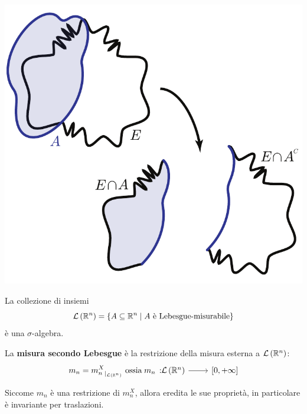 	\begin{center}
		\includegraphics[trim=0cm 0cm 0cm 0cm, clip, scale=0.5]{images/criteriomisurabilita.pdf}
	\end{center}
	\begin{propositionqed}
		La collezione di insiemi
		\begin{equation*}
			\mathcal{L}\left(\mathbb{R}^n\right)=\left\{A\subseteq \mathbb{R}^n\mid A\text{ è Lebesgue-misurabile}\right\}
		\end{equation*}
		è una $\sigma$-algebra.
	\end{propositionqed}
	\begin{define}
		La \textbf{misura secondo Lebesgue} è la restrizione della misura esterna a $\mathcal{L}\left(\mathbb{R}^n\right)$:
		\begin{equation}
			m_n={m^X_n}_{\vert_{ \mathcal{L}\left(\realset^n\right)}}\text{ ossia }\funz{m_n}{\mathcal{L}\left(\realset^n\right)}{\left[0,+\infty\right]}
		\end{equation}
	\end{define}
\begin{observe}
	Siccome $m_n$ è una restrizione di $m_n^X$, allora eredita le sue proprietà, in particolare è invariante per traslazioni.
\end{observe}
